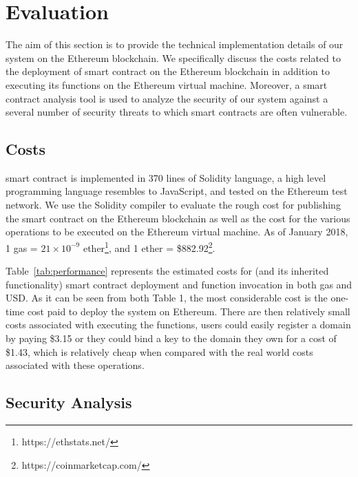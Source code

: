 
\section{Evaluation}

The aim of this section is to provide the technical implementation details of our system on the Ethereum blockchain. We specifically discuss the costs related to the deployment of \Ghazalstar smart contract on the Ethereum blockchain in addition to executing its functions on the Ethereum virtual machine. Moreover, a smart contract analysis tool is used to analyze the security of our system against a several number of security threats to which smart contracts are often vulnerable.


\subsection{Costs}

\Ghazal smart contract is implemented in 370 lines of Solidity language, a high level programming language resembles to JavaScript, and tested on the Ethereum test network. We use the Solidity compiler to evaluate the rough cost for publishing the \Ghazalstar smart contract on the Ethereum blockchain as well as the cost for the various operations to be executed on the Ethereum virtual machine. As of January 2018, 1 gas =  $21\times10^{-9}$ ether\footnote{https://ethstats.net/}, and 1 ether = \$882.92\footnote{https://coinmarketcap.com/}.

Table~\ref{tab:performance} represents the estimated costs for \Ghazalstar (and its inherited \Ghazal functionality) smart contract deployment and function invocation in both gas and USD. As it can be seen from both Table 1, the most considerable cost is the one-time cost paid to deploy the system on Ethereum. There are then relatively small costs associated with executing the functions, \ie users could easily register a domain by paying \$3.15 or they could bind a key to the domain they own for a cost of \$1.43, which is relatively cheap when compared with the real world costs associated with these operations.


\subsection{Security Analysis}

